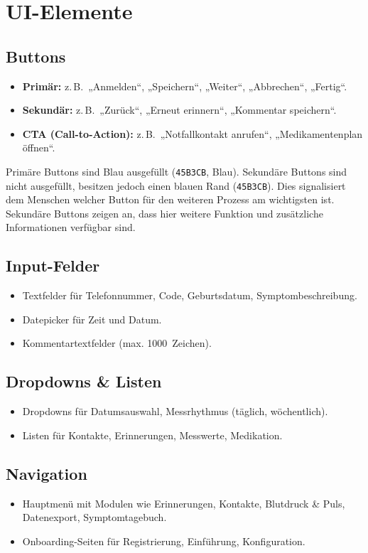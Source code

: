\section{UI-Elemente}
\subsection{Buttons}
\begin{itemize}
	\item \textbf{Primär:} z.\,B.\ „Anmelden“, „Speichern“, „Weiter“, „Abbrechen“, „Fertig“.
	\item \textbf{Sekundär:} z.\,B.\ „Zurück“, „Erneut erinnern“, „Kommentar speichern“.
	\item \textbf{CTA (Call-to-Action):} z.\,B.\ „Notfallkontakt anrufen“, „Medikamentenplan öffnen“.
\end{itemize}

Primäre Buttons sind Blau ausgefüllt (\texttt{45B3CB}, Blau). Sekundäre Buttons sind nicht ausgefüllt, besitzen jedoch einen blauen Rand (\texttt{45B3CB}). Dies signalisiert dem Menschen welcher Button für den weiteren Prozess am wichtigsten ist. Sekundäre Buttons zeigen an, dass hier weitere Funktion und zusätzliche Informationen verfügbar sind.

\subsection{Input-Felder}
\begin{itemize}
	\item Textfelder für Telefonnummer, Code, Geburtsdatum, Symptombeschreibung.
	\item Datepicker für Zeit und Datum.
	\item Kommentartextfelder (max. 1000~Zeichen).
\end{itemize}

\subsection{Dropdowns \& Listen}
\begin{itemize}
	\item Dropdowns für Datumsauswahl, Messrhythmus (täglich, wöchentlich).
	\item Listen für Kontakte, Erinnerungen, Messwerte, Medikation.
\end{itemize}

\subsection{Navigation}
\begin{itemize}
	\item Hauptmenü mit Modulen wie Erinnerungen, Kontakte, Blutdruck \& Puls, Datenexport, Symptomtagebuch.
	\item Onboarding-Seiten für Registrierung, Einführung, Konfiguration.
\end{itemize}


